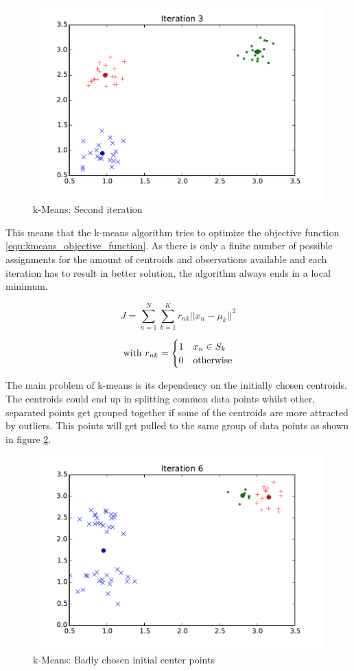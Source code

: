 \begin{figure}
\centering
\includegraphics[width=0.4\linewidth]{img/iteration03}
\caption{k-Means: Second iteration}
\label{fig:kmeans:iteration03}
\end{figure}


This means that the k-means algorithm tries to optimize the objective function \ref{eqn:kmeans_objective_function}. As there is only a finite number of possible assignments for the amount of centroids and observations available and each iteration has to result in better solution, the algorithm always ends in a local minimum.

\begin{equation}
J = \sum_{n=1}^{N} \sum_{k=1}^{K} r_{nk} ||x_n - \mu_k||^2
\label{eqn:kmeans_objective_function}
\end{equation}

\[
\text{with } \\
r_{nk} = \begin{cases}
1 & x_n \in S_k \\
0 & \text{otherwise}
\end{cases}
\]


The main problem of k-means is its dependency on the initially chosen centroids. The centroids could end up in splitting common data points whilst other, separated points get grouped together if some of the centroids are more attracted by outliers. This points will get pulled to the same group of data points as shown in figure \ref{fig:kmeans_bad}.


\begin{figure}[h]
\centering
\includegraphics[width=0.4\linewidth]{img/kmeans_bad}
\caption{k-Means: Badly chosen initial center points}
\label{fig:kmeans_bad}
\end{figure}

